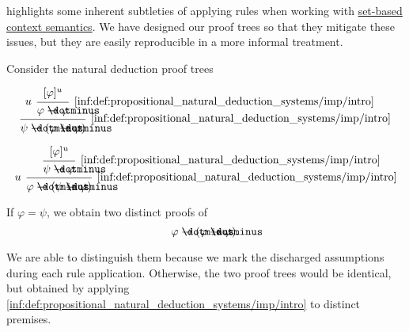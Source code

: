 \begin{example}\label{ex:proof_tree_non_uniqueness}
   highlights some inherent subtleties of applying rules when working with \hyperref[def:logical_context_semantics]{set-based context semantics}. We have designed our proof trees so that they mitigate these issues, but they are easily reproducible in a more informal treatment.

  Consider the natural deduction proof trees
  \begin{paracol}{2}
    \begin{leftcolumn}
      \ParacolAlignmentHack
      \begin{equation*}
        \begin{prooftree}
          \hypo{ [\varphi]^u }
          \infer[left label=\( u \)]1[\ref{inf:def:propositional_natural_deduction_systems/imp/intro}]{ \varphi \synimplies \varphi }

          \infer1[\ref{inf:def:propositional_natural_deduction_systems/imp/intro}]{ \psi \synimplies (\varphi \synimplies \varphi) }
        \end{prooftree}
      \end{equation*}
    \end{leftcolumn}

    \begin{rightcolumn}
      \ParacolAlignmentHack
      \begin{equation*}
        \begin{prooftree}
          \hypo{ [\varphi]^u }
          \infer1[\ref{inf:def:propositional_natural_deduction_systems/imp/intro}]{ \psi \synimplies \varphi }

          \infer[left label=\( u \)]1[\ref{inf:def:propositional_natural_deduction_systems/imp/intro}]{ \varphi \synimplies (\psi \synimplies \varphi) }
        \end{prooftree}
      \end{equation*}
    \end{rightcolumn}
  \end{paracol}

  If \( \varphi = \psi \), we obtain two distinct proofs of
  \begin{equation*}
    \varphi \synimplies (\varphi \synimplies \varphi).
  \end{equation*}

  We are able to distinguish them because we mark the discharged assumptions during each rule application. Otherwise, the two proof trees would be identical, but obtained by applying \ref{inf:def:propositional_natural_deduction_systems/imp/intro} to distinct premises.


\end{example}
